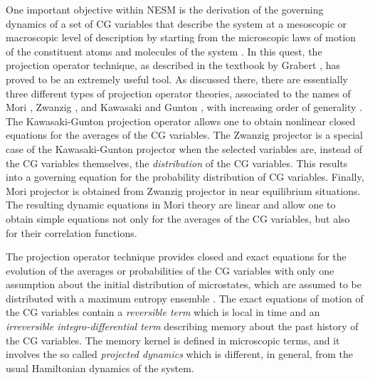 \documentclass[b5paper,openright,10pt]{book}
\begin{document}
One important  objective within NESM
is the derivation of the governing dynamics of a set of
CG variables that describe the system at a mesoscopic or macroscopic
level of description  by starting from the microscopic  laws of motion
of the constituent atoms and  molecules of the system \cite{Kubo1991}.
In this quest, the projection  operator technique, as described in the
textbook by Grabert \cite{Grabert1982}, has  proved to be an extremely
useful  tool.   As  discussed   there,  there  are  essentially  three
different  types of  projection operator  theories, associated  to the
names  of   Mori  \cite{Mori1965},  Zwanzig   \cite{Zwanzig1961},  and
Kawasaki  and Gunton  \cite{Kawasaki1973},  with  increasing order  of
generality \cite{Grabert1982}. The Kawasaki-Gunton projection operator
allows one to  obtain nonlinear closed equations for  the averages of
the CG variables. The Zwanzig  projector is a special case
of  the Kawasaki-Gunton  projector  when the  selected variables  are,
instead of  the CG variables themselves,  the \textit{distribution} of
the  CG variables.  This results  into  a governing  equation for  the
probability distribution of CG  variables.  Finally, Mori projector is
obtained    from    Zwanzig     projector    in    near    equilibrium
situations\cite{Grabert1982,Kauzlaric2011a}.   The  resulting  dynamic
equations in  Mori theory are  linear and  allow one to  obtain simple
equations not only for the averages  of the CG variables, but also for
their correlation functions.

The projection operator technique  provides closed and exact equations
for the  evolution of the averages or probabilities  of the CG variables  with only one
assumption about  the initial  distribution of microstates,  which are
assumed   to  be   distributed   with  a   maximum  entropy   ensemble
\cite{Grabert1982}. The exact equations of  motion of the CG variables
contain a \textit{reversible  term} which is local in time  and an \textit{irreversible
integro-differential term} describing memory  about the past history of
the CG variables.  The memory  kernel is defined in microscopic terms,
and  it involves the so called \textit{projected
dynamics} which  is different, in  general, from the  usual Hamiltonian
dynamics of the system.
\end{document}
